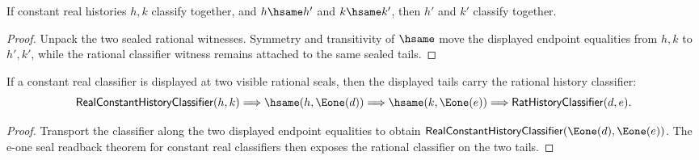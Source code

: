 \begin{theorem}
\label{thm:real-constant-history-classifier-endpoint-transport}
If constant real histories $h,k$ classify together, and $h\hsame h'$ and
$k\hsame k'$, then $h'$ and $k'$ classify together.
\end{theorem}
\begin{proof}
Unpack the two sealed rational witnesses. Symmetry and transitivity of
$\hsame$ move the displayed endpoint equalities from $h,k$ to $h',k'$, while
the rational classifier witness remains attached to the same sealed tails.
\end{proof}

\begin{theorem}
\label{thm:real-constant-history-classifier-e1-tail-readback}
If a constant real classifier is displayed at two visible rational seals, then
the displayed tails carry the rational history classifier:
$$
\mathsf{RealConstantHistoryClassifier}(h,k)\Longrightarrow
\hsame(h,\Eone(d))\Longrightarrow
\hsame(k,\Eone(e))\Longrightarrow
\mathsf{RatHistoryClassifier}(d,e).
$$
\end{theorem}
\begin{proof}
Transport the classifier along the two displayed endpoint equalities to obtain
$\mathsf{RealConstantHistoryClassifier}(\Eone(d),\Eone(e))$. The e-one seal
readback theorem for constant real classifiers then exposes the rational
classifier on the two tails.
\end{proof}

